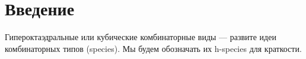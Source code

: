 \section{Введение}
Гипероктаэдральные или кубические комбинаторные виды --- развите идеи комбинаторных типов (species).
Мы будем обозначать их h-species для краткости.
